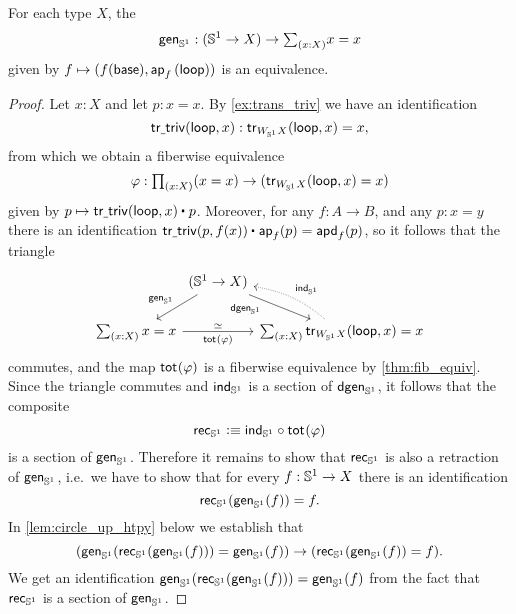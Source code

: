 \begin{thm}\label{thm:circle_up} 
For each type $X$, the 
\begin{equation*}
\mathsf{gen}_{\sphere{1}}:(\sphere{1}\to X)\to \sm{x:X}x=x
\end{equation*}
given by $f\mapsto (f(\mathsf{base}),\mathsf{ap}_{f}\left({\mathsf{loop}}\right))$ is an equivalence.
\end{thm}

\begin{proof}
Let $x:X$ and let $p:x=x$. By \cref{ex:trans_triv} we have an identification 
\begin{equation*}
\mathsf{tr\underline{\ }{}triv}(\mathsf{loop},x):\mathsf{tr}_{W_{\mathbb{S}^{1}}X}(\mathsf{loop},x)=x,
\end{equation*}
from which we obtain a fiberwise equivalence
\begin{equation*}
\varphi : \prd{x:X} (x=x) \to (\mathsf{tr}_{W_{\sphere{1}}X}(\lloop,x)=x)
\end{equation*}
given by $p\mapsto \ct{\mathsf{tr\usc{}triv}(\lloop,x)}{p}$.
Moreover, for any $f:A\to B$, and any $p:x=y$ there is an identification $\ct{\mathsf{tr\usc{}triv}(p,f(x))}{\mathsf{ap}_f(p)}=\apd{f}{p}$, so it follows that the triangle
\begin{equation*}
\begin{tikzcd}[column sep=0]
& (\sphere{1}\to X) \arrow[dl,swap,"\mathsf{gen}_{\sphere{1}}"] \arrow[dr,swap,"\mathsf{dgen}_{\sphere{1}}" near start] \\
\sm{x:X}x=x \arrow[rr,"\total{\varphi}"',"\eqvsym"] & & \sm{x:X} \mathsf{tr}_{W_{\sphere{1}}X}(\lloop,x)=x \arrow[ul,densely dotted,bend right=15,swap,"\ind{\sphere{1}}"]
\end{tikzcd}
\end{equation*}
commutes, and the map $\mathsf{tot}_{}(\varphi)$ is a fiberwise equivalence by \cref{thm:fib_equiv}. Since the triangle commutes and $\mathsf{ind}_{\mathbb{S}^{1}}$ is a section of $\mathsf{dgen}_{\mathbb{S}^{1}}$, it follows that the composite
\begin{equation*}
\mathsf{rec}_{\mathbb{S}^{1}}\vcentcolon\equiv \mathsf{ind}_{\mathbb{S}^{1}}\circ \mathsf{tot}_{}(\varphi)
\end{equation*}
is a section of $\mathsf{gen}_{\mathbb{S}^{1}}$. Therefore it remains to show that $\mathsf{rec}_{\mathbb{S}^{1}}$ is also a retraction of $\mathsf{gen}_{\mathbb{S}^{1}}$, i.e.~we have to show that for every $f:\mathbb{S}^{1}\to X$ there is an identification
\begin{equation*}
\mathsf{rec}_{\mathbb{S}^{1}}(\mathsf{gen}_{\mathbb{S}^{1}}(f))=f.
\end{equation*}
In \cref{lem:circle_up_htpy} below we establish that
\begin{equation*}
(\mathsf{gen}_{\mathbb{S}^{1}}(\mathsf{rec}_{\mathbb{S}^{1}}(\mathsf{gen}_{\mathbb{S}^{1}}(f)))=\mathsf{gen}_{\mathbb{S}^{1}}(f))\to (\mathsf{rec}_{\mathbb{S}^{1}}(\mathsf{gen}_{\mathbb{S}^{1}}(f))=f).
\end{equation*}
We get an identification $\mathsf{gen}_{\mathbb{S}^{1}}(\mathsf{rec}_{\mathbb{S}^{1}}(\mathsf{gen}_{\mathbb{S}^{1}}(f)))=\mathsf{gen}_{\mathbb{S}^{1}}(f)$ from the fact that $\mathsf{rec}_{\mathbb{S}^{1}}$ is a section of $\mathsf{gen}_{\mathbb{S}^{1}}$.
\end{proof}

